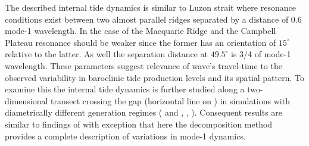 \documentclass[12pt]{article}
\begin{document}
The described internal tide dynamics is similar to Luzon strait where resonance conditions exist 
between two almost parallel ridges \citep{buijsman2012double, buijsman2014three} separated by a 
distance of 0.6 mode-1 wavelength. In the case of the Macquarie Ridge and the Campbell Plateau 
resonance should be weaker since the former has an orientation of $15^{\circ}$ relative to the 
latter. As well the separation distance at $49.5^{\circ}$ is 3/4 of mode-1 wavelength. These 
parameters suggest relevance of wave's travel-time to the observed variability in baroclinic tide 
production levels and its spatial pattern. To examine this the internal tide dynamics is further 
studied along a two-dimensional transect crossing the gap (horizontal line on 
) in simulations with diametrically different generation regimes ( 
and , , ). Consequent 
results are similar to findings of \citep{echeverri2010internal, buijsman2012double} with 
exception that here the decomposition method provides a complete description of variations in 
mode-1 dynamics.\\
\end{document}
